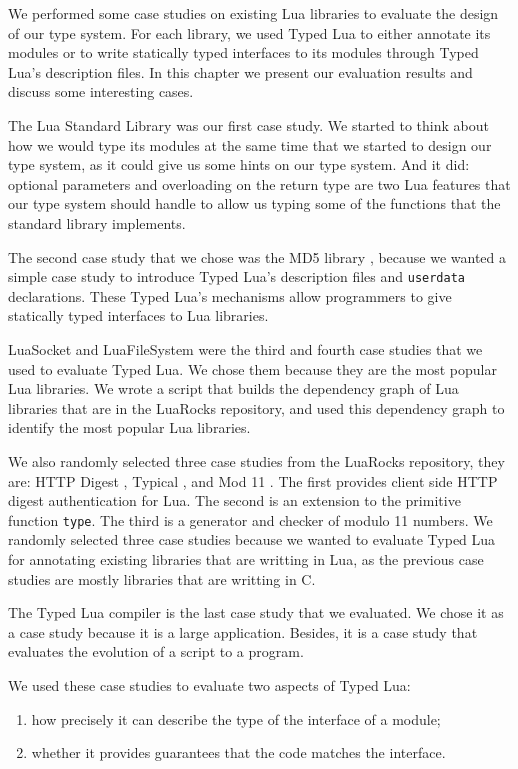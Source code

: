 
We performed some case studies on existing Lua libraries
to evaluate the design of our type system.
For each library, we used Typed Lua to either annotate its modules
or to write statically typed interfaces to its modules through
Typed Lua's description files.
In this chapter we present our evaluation results and discuss some
interesting cases.

The Lua Standard Library \citep{luamanual} was our first case study.
We started to think about how we would type its modules at the same time
that we started to design our type system, as it could give us some
hints on our type system.
And it did: optional parameters and overloading on the return type
are two Lua features that our type system should handle to allow us
typing some of the functions that the standard library implements.

The second case study that we chose was the MD5 library \citep{lmd5},
because we wanted a simple case study to introduce Typed Lua's description
files and \texttt{userdata} declarations.
These Typed Lua's mechanisms allow programmers to give statically typed
interfaces to Lua libraries.

LuaSocket \citep{luasocket} and LuaFileSystem \citep{luafilesystem} were
the third and fourth case studies that we used to evaluate Typed Lua.
We chose them because they are the most popular Lua libraries.
We wrote a script that builds the dependency graph of Lua libraries
that are in the LuaRocks repository, and used this dependency graph
to identify the most popular Lua libraries.

We also randomly selected three case studies from the LuaRocks
repository, they are: HTTP Digest \citep{luahttpdigest},
Typical \citep{luatypical}, and Mod 11 \citep{luamod11}.
The first provides client side HTTP digest authentication for Lua.
The second is an extension to the primitive function \texttt{type}.
The third is a generator and checker of modulo 11 numbers.
We randomly selected three case studies because we wanted to evaluate
Typed Lua for annotating existing libraries that are writting in Lua,
as the previous case studies are mostly libraries that are writting in C.

The Typed Lua compiler is the last case study that we evaluated.
We chose it as a case study because it is a large application.
Besides, it is a case study that evaluates the evolution of a script
to a program.

We used these case studies to evaluate two aspects of Typed Lua:
\begin{enumerate}
\item how precisely it can describe the type of the interface of a module;
\item whether it provides guarantees that the code matches the interface.
\end{enumerate}

